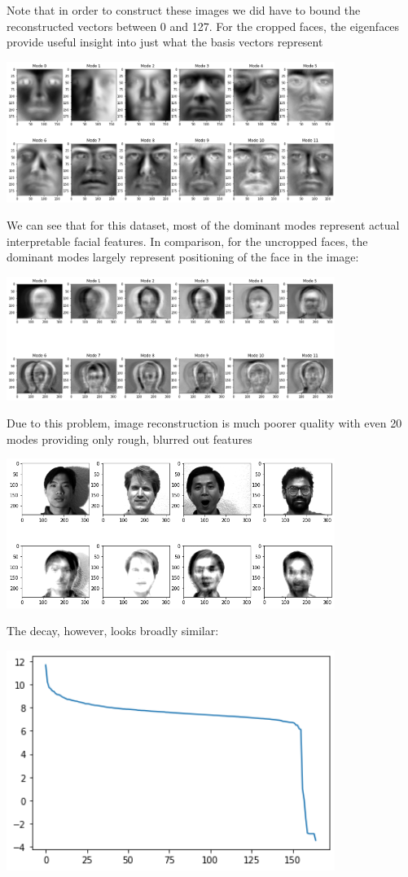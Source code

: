 \documentclass[letter, 12pt]{article}
\begin{document}
Note that in order to construct these images we did have to bound the reconstructed vectors between 0 and 127. For the cropped faces, the eigenfaces provide useful insight into just what the basis vectors represent
\begin{center}
\includegraphics[width=0.8\textwidth]{modes.png}
\end{center}
We can see that for this dataset, most of the dominant modes represent actual interpretable facial features. In comparison, for the uncropped faces, the dominant modes largely represent positioning of the face in the image:
\begin{center}
\includegraphics[width=0.8\textwidth]{position.png}
\end{center}
Due to this problem, image reconstruction is much poorer quality with even 20 modes providing only rough, blurred out features
\begin{center}
\includegraphics[width=0.8\textwidth]{uncropped_recon.png}
\end{center}
The decay, however, looks broadly similar:
\begin{center}
\includegraphics[width=0.8\textwidth]{uncrop_decay.png}
\end{center}
\end{document}
